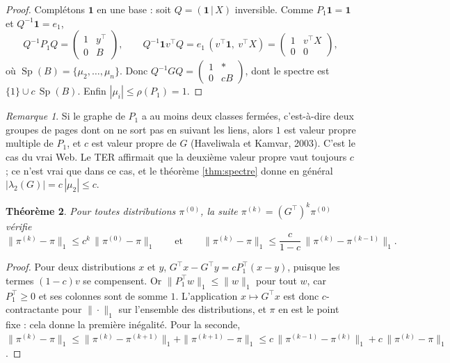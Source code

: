 \documentclass[11pt,a4paper]{article}
\theoremstyle{plain}
\newtheorem{theoreme}{Théorème}[section]
\theoremstyle{definition}
\theoremstyle{remark}
\newtheorem{remarque}[theoreme]{Remarque}
\newcommand{\un}{\mathbf{1}}
\DeclareMathOperator{\Sp}{Sp}
\begin{document}
\begin{proof}
Complétons $\un$ en une base : soit $Q=(\un\,|\,X)$ inversible. Comme $P_1\un=\un$ et $Q^{-1}\un=e_1$,
\[
  Q^{-1}P_1Q=\begin{pmatrix}1&y^\top\\0&B\end{pmatrix},\qquad
  Q^{-1}\un v^\top Q=e_1\,(v^\top\un,\ v^\top X)=\begin{pmatrix}1&v^\top X\\0&0\end{pmatrix},
\]
où $\Sp(B)=\{\mu_2,\dots,\mu_n\}$. Donc $Q^{-1}GQ=\begin{pmatrix}1&*\\0&cB\end{pmatrix}$, dont le spectre est $\{1\}\cup c\,\Sp(B)$. Enfin $|\mu_i|\leq\rho(P_1)=1$.
\end{proof}

\begin{remarque}
Si le graphe de $P_1$ a au moins deux classes fermées, c'est-à-dire deux groupes de pages dont on ne sort pas en suivant les liens, alors $1$ est valeur propre multiple de $P_1$, et $c$ est valeur propre de $G$ (Haveliwala et Kamvar, 2003). C'est le cas du vrai Web. Le TER affirmait que la deuxième valeur propre vaut toujours $c$ ; ce n'est vrai que dans ce cas, et le théorème \ref{thm:spectre} donne en général $|\lambda_2(G)|=c\,|\mu_2|\leq c$.
\end{remarque}

\begin{theoreme}\label{thm:puissance}
Pour toutes distributions $\pi^{(0)}$, la suite $\pi^{(k)}=(G^\top)^k\pi^{(0)}$ vérifie
\[
  \|\pi^{(k)}-\pi\|_1\leq c^k\,\|\pi^{(0)}-\pi\|_1
  \qquad\text{et}\qquad
  \|\pi^{(k)}-\pi\|_1\leq\frac{c}{1-c}\,\|\pi^{(k)}-\pi^{(k-1)}\|_1 .
\]
\end{theoreme}

\begin{proof}
Pour deux distributions $x$ et $y$, $G^\top x-G^\top y=cP_1^\top(x-y)$, puisque les termes $(1-c)v$ se compensent. Or $\|P_1^\top w\|_1\leq\|w\|_1$ pour tout $w$, car $P_1^\top\geq0$ et ses colonnes sont de somme $1$. L'application $x\mapsto G^\top x$ est donc $c$-contractante pour $\|\cdot\|_1$ sur l'ensemble des distributions, et $\pi$ en est le point fixe : cela donne la première inégalité. Pour la seconde, $\|\pi^{(k)}-\pi\|_1\leq\|\pi^{(k)}-\pi^{(k+1)}\|_1+\|\pi^{(k+1)}-\pi\|_1\leq c\,\|\pi^{(k-1)}-\pi^{(k)}\|_1+c\,\|\pi^{(k)}-\pi\|_1$.
\end{proof}
\end{document}
